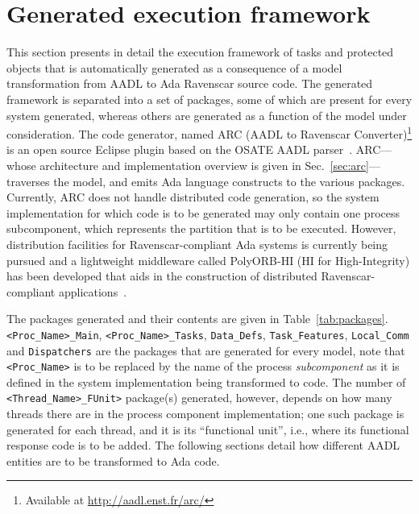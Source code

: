 \section{Generated execution framework}
This section presents in detail the execution framework of tasks and
protected objects that is automatically generated as a consequence of
a model transformation from AADL to Ada Ravenscar source code. The
generated framework is separated into a set of packages, some of which
are present for every system generated, whereas others are generated
as a function of the model under consideration. The code generator,
named ARC (AADL to Ravenscar Converter)\footnote{Available at
  \url{http://aadl.enst.fr/arc/}} is an open source Eclipse plugin
based on the OSATE AADL parser~\cite{sei-osate}. ARC---whose
architecture and implementation overview is given in
Sec.~\ref{sec:arc}---traverses the model, and emits Ada language
constructs to the various packages. Currently, ARC does not handle
distributed code generation, so the system implementation for which
code is to be generated may only contain one process subcomponent,
which represents the partition that is to be executed. However,
distribution facilities for Ravenscar-compliant Ada systems is
currently being pursued and a lightweight middleware called PolyORB-HI
(HI for High-Integrity) has been developed that aids in the
construction of distributed Ravenscar-compliant
applications~\cite{zalila@ae07}.

The packages generated and their contents are given in
Table~\ref{tab:packages}. \texttt{<Proc\_Name>\_Main},
\texttt{<Proc\_Name>\-\_Tasks}, \texttt{Data\_Defs},
\texttt{Task\_Features}, \texttt{Local\_Comm} and \texttt{Dispatchers}
are the packages that are generated for every model, note that
\texttt{<Proc\_Name>} is to be replaced by the name of the process
\emph{subcomponent} as it is defined in the system implementation
being transformed to code. The number of
\texttt{<Thread\_Name>\_FUnit>} package(s) generated, however, depends
on how many threads there are in the process component implementation;
one such package is generated for each thread, and it is its
``functional unit'', i.e., where its functional response code is to be
added. The following sections detail how different AADL entities are
to be transformed to Ada code.

